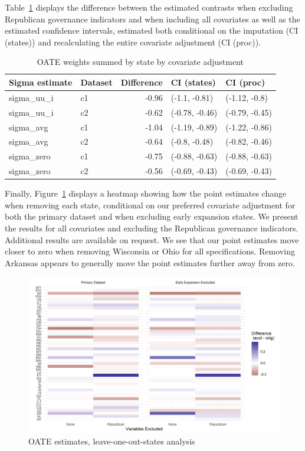 \documentclass[12pt]{article}
\begin{document}
Table~\ref{tab:oaterepubdiff} displays the difference between the estimated contrasts when excluding Republican governance indicators and when including all covariates as well as the estimated confidence intervals, estimated both conditional on the imputation (CI (states)) and recalculating the entire covariate adjustment (CI (proc)).

\begin{table}[ht]
\centering
\begin{tabular}{llrll}
  \toprule
Sigma estimate & Dataset & Difference & CI (states) & CI (proc) \\ 
  \midrule
sigma\_uu\_i & c1 & -0.96 & (-1.1, -0.81) & (-1.12, -0.8) \\ 
  sigma\_uu\_i & c2 & -0.62 & (-0.78, -0.46) & (-0.79, -0.45) \\ 
  sigma\_avg & c1 & -1.04 & (-1.19, -0.89) & (-1.22, -0.86) \\ 
  sigma\_avg & c2 & -0.64 & (-0.8, -0.48) & (-0.82, -0.46) \\ 
  sigma\_zero & c1 & -0.75 & (-0.88, -0.63) & (-0.88, -0.63) \\ 
  sigma\_zero & c2 & -0.56 & (-0.69, -0.43) & (-0.69, -0.43) \\ 
   \bottomrule
\end{tabular}
\caption{OATE weights summed by state by covariate adjustment}
\label{tab:oaterepubdiff}
\end{table}

Finally, Figure~\ref{fig:oateheatmap} displays a heatmap showing how the point estimates change when removing each state, conditional on our preferred covariate adjustment for both the primary dataset and when excluding early expansion states. We present the results for all covariates and excluding the Republican governance indicators. Additional results are available on request. We see that our point estimates move closer to zero when removing Wisconsin or Ohio for all specifications. Removing Arkansas appears to generally move the point estimates further away from zero.

\begin{figure}[]
\begin{center}
    \includegraphics[scale=0.6]{01_Plots/oate-loo-state-cov-group-heatmap-states.png}
    \caption{OATE estimates, leave-one-out-states analysis}
    \label{fig:oateheatmap}
\end{center}
\end{figure}
\end{document}
